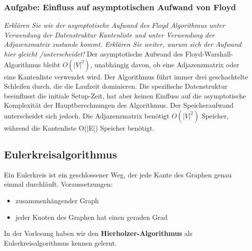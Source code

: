 \documentclass{article}
\begin{document}
\subsubsection{Aufgabe: Einfluss auf asymptotischen Aufwand von Floyd \textcolor{ForestGreen}{\CheckmarkBold}}
\textit{Erklären Sie wie der asymptotische  Aufwand des Floyd Algorithmus  unter Verwendung der Datenstruktur Kantenliste   und unter Verwendung der Adjazenzmatrix zustande kommt. Erklären Sie weiter, warum sich der Aufwand hier gleicht /unterscheidet! } \cite{hauptklausur21} \newline \newline
Der asymptotische Aufwand des Floyd-Warshall-Algorithmus bleibt $O(|V|^3)$, unabhängig davon, ob eine Adjazenzmatrix oder eine Kantenliste verwendet wird. Der Algorithmus führt immer drei geschachtelte Schleifen durch, die die Laufzeit dominieren. Die spezifische Datenstruktur beeinflusst die initiale Setup-Zeit, hat aber keinen Einfluss auf die asymptotische Komplexität der Hauptberechnungen des Algorithmus. \newline
Der Speicheraufwand unterscheidet sich jedoch. Die Adjazenzmatrix benötigt $O(|V|^2)$ Speicher, während die Kantenliste O(|E|) Speicher benötigt. 
\newpage
\subsection{Eulerkreisalgorithmus}
\begin{definitionbox}[title=Eulerkreis]
 Ein Eulerkreis ist ein geschlossener Weg, der jede Kante des Graphen genau einmal durchläuft.\newline
 Voraussetzungen:
 \begin{itemize}
     \item zusammenhängender Graph  
     \item jeder Knoten des Graphen hat einen geraden Grad
 \end{itemize}
\end{definitionbox} \noindent
In der Vorlesung haben wir den \textbf{Hierholzer-Algorithmus}  als Eulerkreisalgorithmus kennen gelernt. 
\end{document}

